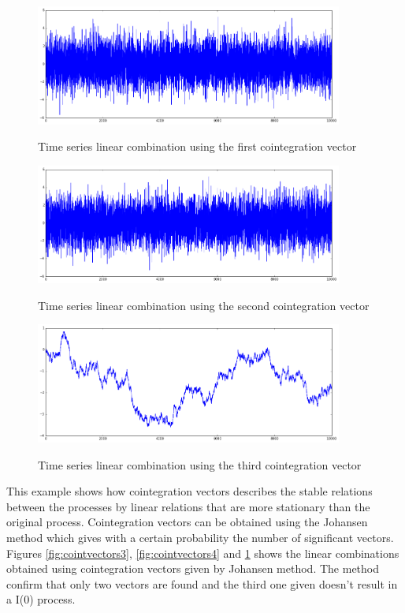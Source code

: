 \begin{figure}[!h]
  \centering
 \begin{minipage}{\textwidth} %
  \centering
  \includegraphics[width=0.9\textwidth]{img/coint-example2} 
   \caption{Time series linear combination using the first cointegration vector }
    \label{fig:cointvectors3}
   \includegraphics[width=0.9\textwidth]{img/coint-example3} 
    \caption{Time series linear combination using the second cointegration vector}
     \label{fig:cointvectors4}
    \includegraphics[width=0.9\textwidth]{img/coint-example4}
 \caption{Time series linear combination using the third cointegration vector}
   \label{fig:cointvectors5}
\end{minipage}
\end{figure}


This example shows how cointegration vectors describes the stable relations
between the processes by linear relations that are more stationary than the
original process. Cointegration vectors can be obtained using the Johansen method which gives with a certain probability the number of significant vectors. Figures    
\ref{fig:cointvectors3}, \ref{fig:cointvectors4}  and \ref{fig:cointvectors5}  shows the linear combinations obtained using cointegration vectors given by Johansen method. The method confirm that only two vectors are found and the third one given doesn't result in a I(0) process.


